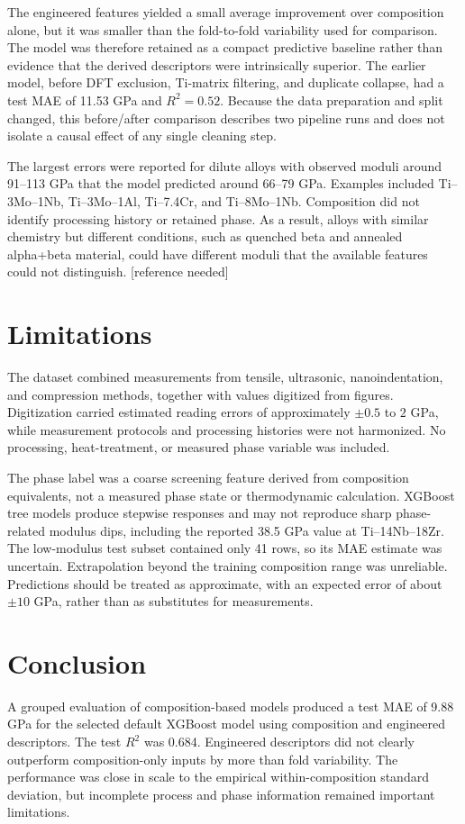 \documentclass[11pt,oneside]{article}
\begin{document}
The engineered features yielded a small average improvement over composition alone, but it was smaller than the fold-to-fold variability used for comparison. The model was therefore retained as a compact predictive baseline rather than evidence that the derived descriptors were intrinsically superior. The earlier model, before DFT exclusion, Ti-matrix filtering, and duplicate collapse, had a test MAE of 11.53 GPa and \(R^2=0.52\). Because the data preparation and split changed, this before/after comparison describes two pipeline runs and does not isolate a causal effect of any single cleaning step.

The largest errors were reported for dilute alloys with observed moduli around 91--113 GPa that the model predicted around 66--79 GPa. Examples included Ti--3Mo--1Nb, Ti--3Mo--1Al, Ti--7.4Cr, and Ti--8Mo--1Nb. Composition did not identify processing history or retained phase. As a result, alloys with similar chemistry but different conditions, such as quenched beta and annealed alpha+beta material, could have different moduli that the available features could not distinguish. [reference needed]

\section{Limitations}
The dataset combined measurements from tensile, ultrasonic, nanoindentation, and compression methods, together with values digitized from figures. Digitization carried estimated reading errors of approximately \(\pm 0.5\) to \(2\) GPa, while measurement protocols and processing histories were not harmonized. No processing, heat-treatment, or measured phase variable was included.

The phase label was a coarse screening feature derived from composition equivalents, not a measured phase state or thermodynamic calculation. XGBoost tree models produce stepwise responses and may not reproduce sharp phase-related modulus dips, including the reported 38.5 GPa value at Ti--14Nb--18Zr. The low-modulus test subset contained only 41 rows, so its MAE estimate was uncertain. Extrapolation beyond the training composition range was unreliable. Predictions should be treated as approximate, with an expected error of about \(\pm 10\) GPa, rather than as substitutes for measurements.

\section{Conclusion}
A grouped evaluation of composition-based models produced a test MAE of 9.88 GPa for the selected default XGBoost model using composition and engineered descriptors. The test \(R^2\) was 0.684. Engineered descriptors did not clearly outperform composition-only inputs by more than fold variability. The performance was close in scale to the empirical within-composition standard deviation, but incomplete process and phase information remained important limitations.
\end{document}
